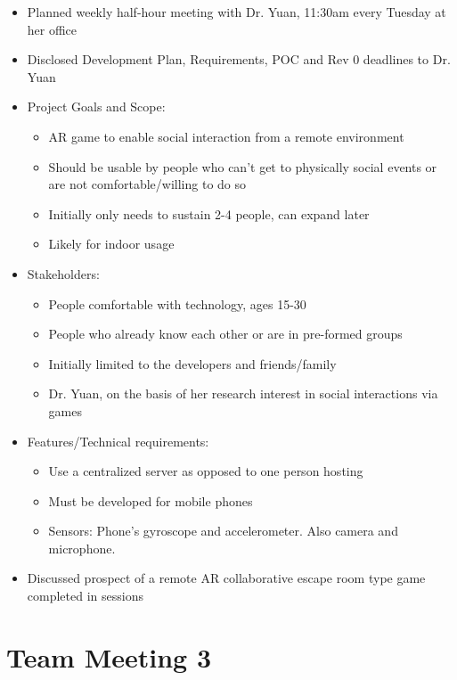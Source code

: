 \documentclass{article}
\begin{document}
\begin{itemize}
    \item Planned weekly half-hour meeting with Dr. Yuan, 11:30am every Tuesday at her office  
    \item Disclosed Development Plan, Requirements, POC and Rev 0 deadlines to Dr. Yuan
    \item Project Goals and Scope:
    \begin{itemize}
        \item AR game to enable social interaction from a remote environment
        \item Should be usable by people who can't get to physically social events or are not comfortable/willing to do so
        \item Initially only needs to sustain 2-4 people, can expand later
        \item Likely for indoor usage
    \end{itemize}
    \item Stakeholders:
    \begin{itemize}
        \item People comfortable with technology, ages 15-30
        \item People who already know each other or are in pre-formed groups
        \item Initially limited to the developers and friends/family
        \item Dr. Yuan, on the basis of her research interest in social interactions via games
    \end{itemize}
    \item Features/Technical requirements:
    \begin{itemize}
        \item Use a centralized server as opposed to one person hosting
        \item Must be developed for mobile phones
        \item Sensors: Phone's gyroscope and accelerometer. Also camera and microphone.
    \end{itemize}
    \item Discussed prospect of a remote AR collaborative escape room type game completed in sessions
\end{itemize}

\pagebreak
\section*{Team Meeting 3}
\end{document}
